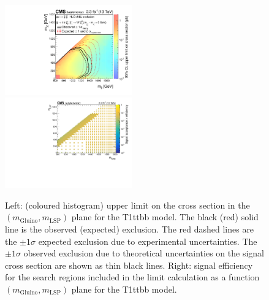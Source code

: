 \begin{figure}[t]
  \begin{center}
    \includegraphics[width=0.49\textwidth]{RA1T1ttbbXSEC_aux} \, 
    \includegraphics[width=0.49\textwidth]{T1ttbb_merging_4_cats_aux} \,     
  \end{center}
  \caption{Left: (coloured histogram) upper limit on the cross section in the $(m_{\mathrm{Gluino}},m_{\mathrm{LSP}})$ plane for the T1ttbb model. 
  The black (red) solid line is the observed (expected) exclusion. The red dashed lines are the $\pm1\sigma$ expected exclusion due to experimental uncertainties. 
  The $\pm1\sigma$ observed exclusion due to theoretical uncertainties on the signal cross section are shown as thin black lines. 
  Right: signal efficiency for the search regions included in the limit calculation as a function $(m_{\mathrm{Gluino}},m_{\mathrm{LSP}})$ plane for the T1ttbb model. 
  \label{fig:T1ttbb_excl}}
\end{figure}


